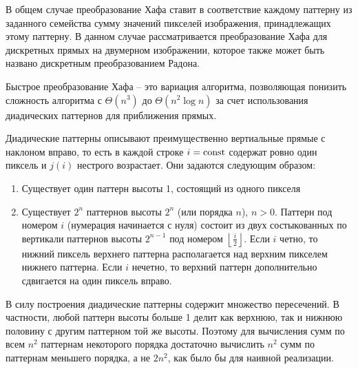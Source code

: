 

В общем случае преобразование Хафа ставит в соответствие каждому паттерну из заданного семейства сумму значений пикселей изображения, принадлежащих этому паттерну. В данном случае рассматривается преобразование Хафа для дискретных прямых на двумерном изображении, которое также может быть названо дискретным преобразованием Радона.

Быстрое преобразование Хафа -- это вариация алгоритма, позволяющая понизить сложность алгоритма с $\Theta(n^3)$ до $\Theta(n^2 \log n)$ за счет использования диадических паттернов для приближения прямых.

Диадические паттерны описывают преимущественно вертиальные прямые с наклоном вправо, то есть в каждой строке $i=\mathrm{const}$ содержат ровно один пиксель и $j(i)$ нестрого возрастает. Они задаются следующим образом:
\begin{enumerate}
\item
    Существует один паттерн высоты 1, состоящий из одного пикселя
\item
    Существует $2^n$ паттернов высоты $2^n$ (или порядка $n$), $n > 0$. Паттерн под номером $i$ (нумерация начинается с нуля) состоит из двух состыкованных по вертикали паттернов высоты $2^{n-1}$ под номером $\left\lfloor \frac{i}{2} \right\rfloor$.
    Если $i$ четно, то нижний пиксель верхнего паттерна располагается над верхним пикселем нижнего паттерна.
    Если $i$ нечетно, то верхний паттерн дополнительно сдвигается на один пиксель вправо.
\end{enumerate}

В силу построения диадические паттерны содержит множество пересечений. В частности, любой паттерн высоты больше 1 делит как верхнюю, так и нижнюю половину с другим паттерном той же высоты. Поэтому для вычисления сумм по всем $n^2$ паттернам некоторого порядка достаточно вычислить $n^2$ сумм по паттернам меньшего порядка, а не $2n^2$, как было бы для наивной реализации.

